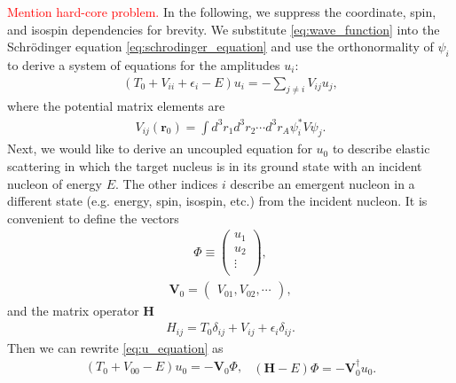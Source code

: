 \documentclass[preprintnumbers,floatfix,aps,prc,preprint,nofootinbib]{revtex4-1}
\begin{document}
\textcolor{red}{Mention hard-core problem.} In the following, we suppress the coordinate, spin, and isospin dependencies for brevity. We substitute \ref{eq:wave_function} into the Schr\"odinger equation \ref{eq:schrodinger_equation} and use the orthonormality of $\psi_i$ to derive a system of equations for the amplitudes $u_i$:
%
\begin{eqnarray}
	\label{eq:u_equation}
	(T_0 + V_{ii} + \epsilon_i - E) u_i = - \sum_{j \neq i} V_{ij} u_j,
\end{eqnarray}
%
where the potential matrix elements are
%
\begin{eqnarray}
	\label{eq:potential_matrix_elements}
	V_{ij}(\textbf{r}_0) = \int{d^3 r_1 d^3 r_2 \cdots d^3 r_A \psi_i^* V \psi_j}.
\end{eqnarray}
%
Next, we would like to derive an uncoupled equation for $u_0$ to describe elastic scattering in which the target nucleus is in its ground state with an incident nucleon of energy $E$. The other indices $i$ describe an emergent nucleon in a different state (e.g. energy, spin, isospin, etc.) from the incident nucleon. It is convenient to define the vectors
%
\begin{eqnarray}
	\label{eq:u_vector}
	\Phi \equiv
	\begin{pmatrix}
		u_1 \\
		u_2 \\
		\vdots \\
	\end{pmatrix}
	,
\end{eqnarray}
%
\begin{eqnarray}
	\label{eq:potential_vector}
	\textbf{V}_0 =
	\begin{pmatrix}
		V_{01}, V_{02}, \cdots
	\end{pmatrix}
	,
\end{eqnarray}
%
and the matrix operator $\textbf{H}$
%
\begin{eqnarray}
	\label{eq:hamiltonian_operator}
	H_{ij} = T_0 \delta_{ij} + V_{ij} + \epsilon_i \delta_{ij}.
\end{eqnarray}
%
Then we can rewrite \ref{eq:u_equation} as
%
\begin{subequations}
	\label{eq:u_vector_equation}
	\begin{eqnarray}
		\label{eq:u_vector_equation_a}
		(T_0 + V_{00} - E) u_0 = -\textbf{V}_0 \Phi,
	\end{eqnarray}
	\begin{eqnarray}
		\label{eq:u_vector_equation_b}
		(\textbf{H}-E) \Phi = -\textbf{V}_0^{\dagger} u_0.
	\end{eqnarray}
\end{subequations}
\end{document}
